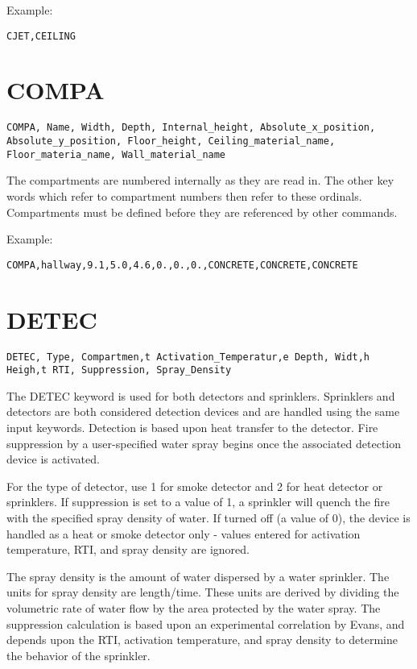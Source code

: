 Example:

\begin{lstlisting}
CJET,CEILING
\end{lstlisting}

\section{COMPA}

\begin{lstlisting}
COMPA, Name, Width, Depth, Internal_height, Absolute_x_position, Absolute_y_position, Floor_height, Ceiling_material_name,  Floor_materia_name, Wall_material_name
\end{lstlisting}

The compartments are numbered internally as they are read in. The other key words which refer to compartment numbers then refer to these ordinals. Compartments must be defined before they are referenced by other commands.

Example:

\begin{lstlisting}
COMPA,hallway,9.1,5.0,4.6,0.,0.,0.,CONCRETE,CONCRETE,CONCRETE
\end{lstlisting}

\section{DETEC}

\begin{lstlisting}
DETEC, Type, Compartmen,t Activation_Temperatur,e Depth, Widt,h Heigh,t RTI, Suppression, Spray_Density
\end{lstlisting}

The DETEC keyword is used for both detectors and sprinklers. Sprinklers and detectors are both considered detection devices and are handled using the same input keywords.  Detection is based upon heat transfer to the detector. Fire suppression by a user-specified water spray begins once the associated detection device is activated.

For the type of detector, use 1 for smoke detector and 2 for heat detector or sprinklers. If suppression is set to a value of 1, a sprinkler will quench the fire with the specified spray density of water. If turned off (a value of 0), the device is handled as a heat or smoke detector only - values entered for activation temperature, RTI, and spray density are ignored. 

The spray density is the amount of water dispersed by a water sprinkler.  The units for spray density are length/time.  These units are derived by dividing the volumetric rate of water flow by the area protected by the water spray. The suppression calculation is based upon an experimental correlation by Evans, and depends upon the RTI, activation temperature, and spray density to determine the behavior of the sprinkler.

